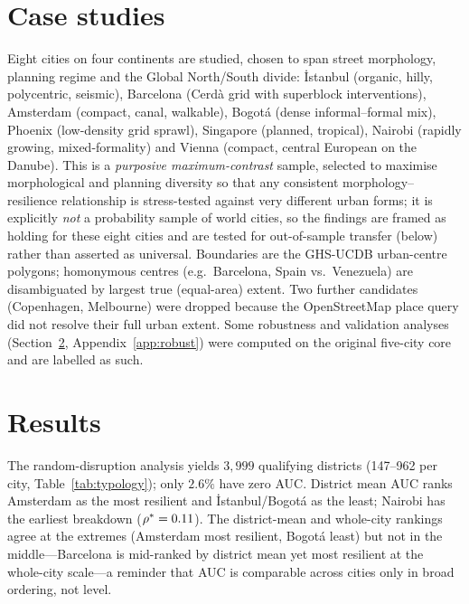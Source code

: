 \section{Case studies}
Eight cities on four continents are studied, chosen to span street morphology, planning
regime and the Global North/South divide: İstanbul (organic, hilly, polycentric,
seismic), Barcelona (Cerdà grid with superblock interventions), Amsterdam (compact,
canal, walkable), Bogotá (dense informal--formal mix), Phoenix (low-density grid
sprawl), Singapore (planned, tropical), Nairobi (rapidly growing, mixed-formality)
and Vienna (compact, central European on the Danube). This is a \emph{purposive
maximum-contrast} sample, selected to maximise morphological and planning diversity so
that any consistent morphology--resilience relationship is stress-tested against very
different urban forms; it is explicitly \emph{not} a probability sample of world
cities, so the findings are framed as holding for these eight cities and are tested for
out-of-sample transfer (below) rather than asserted as universal. Boundaries are the GHS-UCDB
urban-centre polygons; homonymous centres (e.g.\ Barcelona, Spain vs.\ Venezuela)
are disambiguated by largest true (equal-area) extent. Two further candidates
(Copenhagen, Melbourne) were dropped because the OpenStreetMap place query did not
resolve their full urban extent. Some robustness and validation analyses
(Section~\ref{sec:results}, Appendix~\ref{app:robust}) were computed on the original
five-city core and are labelled as such.

\section{Results}\label{sec:results}
The random-disruption analysis yields $3{,}999$ qualifying districts (147--962 per
city, Table~\ref{tab:typology}); only $2.6\%$ have zero AUC. District mean AUC ranks
Amsterdam as the most resilient and İstanbul/Bogotá as the least; Nairobi has the
earliest breakdown ($\rho^{*}=0.11$). The district-mean and whole-city rankings
agree at the extremes (Amsterdam most resilient, Bogotá least) but not in the
middle---Barcelona is mid-ranked by district mean yet most resilient at the
whole-city scale---a reminder that AUC is comparable across cities only in broad
ordering, not level.

